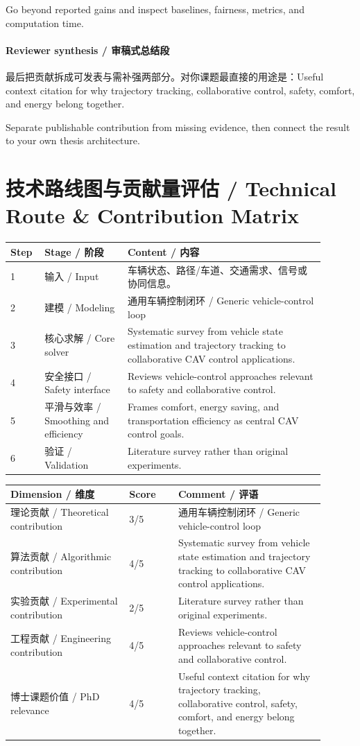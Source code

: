 \documentclass[UTF8,a4paper,11pt,fontset=fandol]{ctexart}
\begin{document}
Go beyond reported gains and inspect baselines, fairness, metrics, and computation time.

\paragraph{Reviewer synthesis / 审稿式总结段}最后把贡献拆成可发表与需补强两部分。对你课题最直接的用途是：Useful context citation for why trajectory tracking, collaborative control, safety, comfort, and energy belong together.

Separate publishable contribution from missing evidence, then connect the result to your own thesis architecture.


\section{技术路线图与贡献量评估 / Technical Route \& Contribution Matrix}
\begin{longtable}{p{0.08\linewidth}p{0.24\linewidth}p{0.58\linewidth}}
\toprule
Step & Stage / 阶段 & Content / 内容\\
\midrule
1 & 输入 / Input & 车辆状态、路径/车道、交通需求、信号或协同信息。 \\
2 & 建模 / Modeling & 通用车辆控制闭环 / Generic vehicle-control loop \\
3 & 核心求解 / Core solver & Systematic survey from vehicle state estimation and trajectory tracking to collaborative CAV control applications. \\
4 & 安全接口 / Safety interface & Reviews vehicle-control approaches relevant to safety and collaborative control. \\
5 & 平滑与效率 / Smoothing and efficiency & Frames comfort, energy saving, and transportation efficiency as central CAV control goals. \\
6 & 验证 / Validation & Literature survey rather than original experiments. \\
\bottomrule
\end{longtable}

\begin{longtable}{p{0.34\linewidth}p{0.14\linewidth}p{0.42\linewidth}}
\toprule
Dimension / 维度 & Score & Comment / 评语\\
\midrule
理论贡献 / Theoretical contribution & 3/5 & 通用车辆控制闭环 / Generic vehicle-control loop \\
算法贡献 / Algorithmic contribution & 4/5 & Systematic survey from vehicle state estimation and trajectory tracking to collaborative CAV control applications. \\
实验贡献 / Experimental contribution & 2/5 & Literature survey rather than original experiments. \\
工程贡献 / Engineering contribution & 4/5 & Reviews vehicle-control approaches relevant to safety and collaborative control. \\
博士课题价值 / PhD relevance & 4/5 & Useful context citation for why trajectory tracking, collaborative control, safety, comfort, and energy belong together. \\
\bottomrule
\end{longtable}
\end{document}

